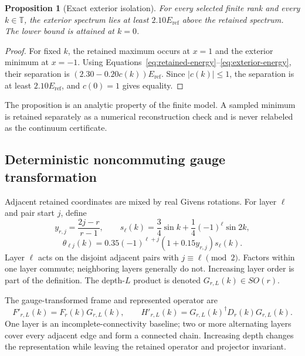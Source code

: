 \documentclass[11pt]{article}
\newtheorem{proposition}{Proposition}
\newcommand{\Torus}{\mathbb T}
\newcommand{\Eref}{E_{\mathrm{ref}}}
\begin{document}
\begin{proposition}[Exact exterior isolation]
For every selected finite rank and every $k\in\Torus$, the exterior spectrum lies at
least $2.10\Eref$ above the retained spectrum. The lower bound is attained at $k=0$.
\end{proposition}

\begin{proof}
For fixed $k$, the retained maximum occurs at $x=1$ and the exterior minimum at $x=-1$.
Using Equations~\eqref{eq:retained-energy}--\eqref{eq:exterior-energy}, their separation
is $(2.30-0.20c(k))\Eref$. Since $|c(k)|\leq1$, the separation is at least
$2.10\Eref$, and $c(0)=1$ gives equality.
\end{proof}

The proposition is an analytic property of the finite model. A sampled minimum is
retained separately as a numerical reconstruction check and is never relabeled as the
continuum certificate.

\subsection{Deterministic noncommuting gauge transformation}

Adjacent retained coordinates are mixed by real Givens rotations. For layer $\ell$ and
pair start $j$, define
\begin{equation}
 y_{r,j}=\frac{2j-r}{r-1},
 \qquad
 s_\ell(k)=\frac34\sin k+\frac14(-1)^\ell\sin 2k,
\end{equation}
\begin{equation}
 \theta_{\ell j}(k)=0.35(-1)^{\ell+j}
 \left(1+0.15y_{r,j}\right)s_\ell(k).
 \label{eq:transformation-angle}
\end{equation}
Layer $\ell$ acts on the disjoint adjacent pairs with $j\equiv\ell\pmod2$. Factors
within one layer commute; neighboring layers generally do not. Increasing layer order is
part of the definition. The depth-$L$ product is denoted $G_{r,L}(k)\in SO(r)$.

The gauge-transformed frame and represented operator are
\begin{equation}
 F'_{r,L}(k)=F_r(k)G_{r,L}(k),
 \qquad
 H'_{r,L}(k)=G_{r,L}(k)^\dagger D_r(k)G_{r,L}(k).
 \label{eq:gauge-transformed-fields}
\end{equation}
One layer is an incomplete-connectivity baseline; two or more alternating layers cover
every adjacent edge and form a connected chain. Increasing depth changes the
representation while leaving the retained operator and projector invariant.
\end{document}
